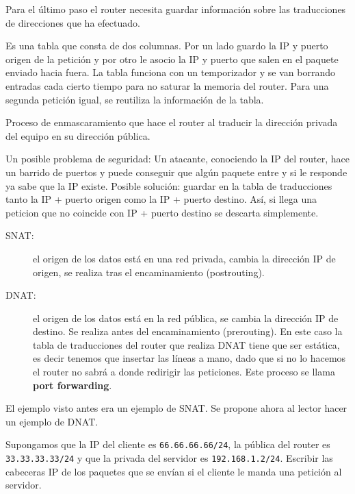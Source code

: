 Para el último paso el router necesita guardar información sobre las traducciones de direcciones que ha efectuado. 
\begin{definicion}
    Es una tabla que consta de dos columnas. Por un lado guardo la IP y puerto origen de la petición y por otro le asocio la IP y puerto que salen en el paquete enviado hacia fuera. 
    La tabla funciona con un temporizador y se van borrando entradas cada cierto tiempo para no saturar la memoria del router. 
    Para una segunda petición igual, se reutiliza la información de la tabla. 
\end{definicion}    

\begin{definicion}[Masquerading]
    Proceso de enmascaramiento que hace el router al traducir la dirección privada del equipo en su dirección pública. 
\end{definicion}

\begin{observacion}
    Un posible problema de seguridad: Un atacante, conociendo la IP del router, hace un barrido de puertos y puede conseguir que algún paquete entre y si le responde ya sabe que la IP existe. 
    Posible solución: guardar en la tabla de traducciones tanto la IP + puerto origen como la IP + puerto destino. Así, si llega una peticion que no coincide con IP + puerto destino se descarta simplemente. 
\end{observacion}

\begin{description}
    \item [\acrshort{SNAT}:] el origen de los datos está en una red privada, cambia la dirección IP de origen, se realiza tras el encaminamiento (postrouting).
    \item [\acrshort{DNAT}:] el origen de los datos está en la red pública, se cambia la dirección IP de destino. Se realiza antes del encaminamiento (prerouting). En este caso la tabla de traducciones del router que realiza \acrshort{DNAT} tiene que ser estática, es decir tenemos que insertar las líneas a mano, dado que si no lo hacemos el router no sabrá a donde redirigir las peticiones. Este proceso se llama \textbf{port forwarding}.
\end{description}

El ejemplo visto antes era un ejemplo de \acrshort{SNAT}. Se propone ahora al lector hacer un ejemplo de \acrshort{DNAT}\@.

\begin{ejercicio}
    Supongamos que la IP del cliente es \verb|66.66.66.66/24|, la pública del router es \verb|33.33.33.33/24| y que la privada del servidor es \verb|192.168.1.2/24|. Escribir las cabeceras IP de los paquetes que se envían si el cliente le manda una petición al servidor. 
\end{ejercicio}


